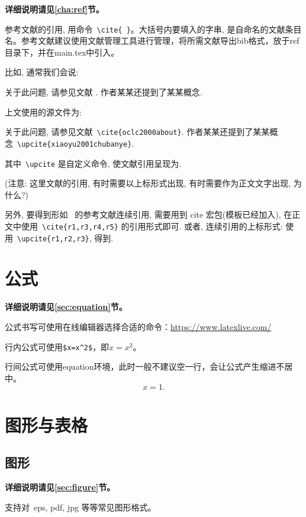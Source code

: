 \textbf{详细说明请见\ref{cha:ref}节。}

参考文献的引用, 用命令~\verb|\cite{ }|。大括号内要填入的字串, 是自命名的文献条目名。参考文献建议使用文献管理工具进行管理，将所需文献导出bib格式，放于ref目录下，并在main.tex中引入。

比如, 通常我们会说:

 {\kaishu
关于此问题, 请参见文献 \cite{oclc2000about}. 作者某某还提到了某某概念.}


上文使用的源文件为:

 {\kaishu
关于此问题, 请参见文献~\verb|\cite{oclc2000about}|. 作者某某还提到了某某概念~\verb|\upcite{xiaoyu2001chubanye}|.
}

其中~\verb|\upcite| 是自定义命令, 使文献引用呈现为.

({\heiti 注意:} {\kaishu 这里文献的引用, 有时需要以上标形式出现, 有时需要作为正文文字出现, 为什么?})

另外, 要得到形如~\cite{r1,r3,r4,r5} 的参考文献连续引用, 需要用到 cite 宏包(模板已经加入),
在正文中使用~\verb|\cite{r1,r3,r4,r5}| 的引用形式即可.
或者, 连续引用的上标形式: 使用~\verb|\upcite{r1,r2,r3}|, 得到.

\section{公式}

\textbf{详细说明请见\ref{sec:equation}节。}

公式书写可使用在线编辑器选择合适的命令：\url{https://www.latexlive.com/}

行内公式可使用\verb|$x=x^2$|，即$x=x^2$。

行间公式可使用equation环境，此时一般不建议空一行，会让公式产生缩进不居中。
\begin{equation}
x = 1.
\end{equation}

\section{图形与表格}

\subsection{图形}

\textbf{详细说明请见\ref{sec:figure}节。}

支持对~eps, pdf, jpg 等等常见图形格式。

